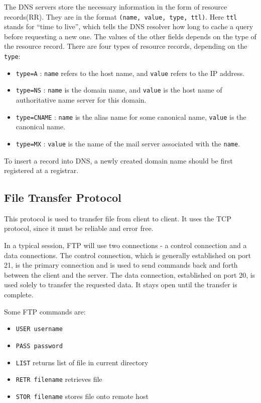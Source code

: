 \documentclass[12pt,letterpaper]{article}
\theoremstyle{definition}
\begin{document}
The DNS servers store the necessary information in the form of resource records(RR). They are in the format \texttt{(name, value, type, ttl)}. Here \texttt{ttl} stands for ``time to live'', which tells the DNS resolver how long to cache a query before requesting a new one. The values of the other fields depends on the type of the resource record. There are four types of resource records, depending on the \texttt{type}:

\begin{itemize}
  \item \texttt{type=A} : \texttt{name} refers to the host name, and \texttt{value} refers to the IP address.
  \item \texttt{type=NS} : \texttt{name} is the domain name, and \texttt{value} is the host name of authoritative name server for this domain.
  \item \texttt{type=CNAME} : \texttt{name} is the alias name for some canonical name, \texttt{value} is the canonical name.
\item \texttt{type=MX} : \texttt{value} is the name of the mail server associated with the \texttt{name}.
\end{itemize}

To insert a record into DNS, a newly created domain name should be first registered at a registrar.

\subsection{File Transfer Protocol}

This protocol is used to transfer file from client to client. It uses the TCP protocol, since it must be reliable and error free.

In a typical session, FTP will use two connections - a control connection and a data connections. The control connection, which is generally established on port 21, is the primary connection and is used to send commands back and forth between the client and the server. The data connection, established on port 20, is used solely to transfer the requested data. It stays open until the transfer is complete.

Some FTP commands are:

\begin{itemize}
  \item \texttt{USER username} 
  \item \texttt{PASS password} 
  \item \texttt{LIST} returns list of file in current directory
  \item \texttt{RETR filename} retrieves file
  \item \texttt{STOR filename} stores file onto remote host
\end{itemize}
\end{document}
